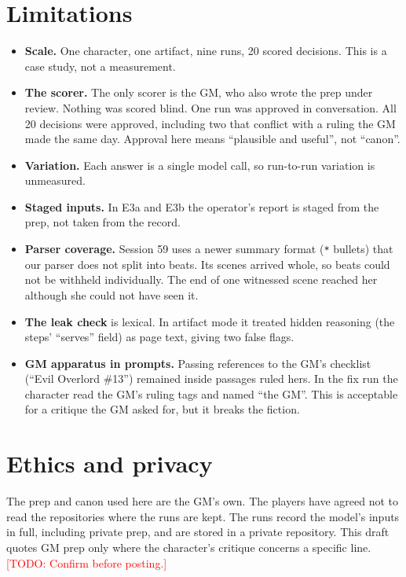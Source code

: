 \documentclass[11pt]{article}
\newcommand{\todo}[1]{\textcolor{red}{[TODO: #1]}}
\newcommand{\code}[1]{\texttt{#1}}
\begin{document}
\section{Limitations}
\label{sec:limitations}

\begin{itemize}[nosep]
\item \textbf{Scale.} One character, one artifact, nine runs, 20 scored decisions. This is a
case study, not a measurement.
\item \textbf{The scorer.} The only scorer is the GM, who also wrote the prep under review.
Nothing was scored blind. One run was approved in conversation. All 20 decisions were
approved, including two that conflict with a ruling the GM made the same day. Approval
here means ``plausible and useful'', not ``canon''.
\item \textbf{Variation.} Each answer is a single model call, so run-to-run variation is
unmeasured.
\item \textbf{Staged inputs.} In E3a and E3b the operator's report is staged from the prep,
not taken from the record.
\item \textbf{Parser coverage.} Session 59 uses a newer summary format (\code{*} bullets)
that our parser does not split into beats. Its scenes arrived whole, so beats could not be
withheld individually. The end of one witnessed scene reached her although she could not
have seen it.
\item \textbf{The leak check} is lexical. In artifact mode it treated hidden reasoning (the
steps' ``serves'' field) as page text, giving two false flags.
\item \textbf{GM apparatus in prompts.} Passing references to the GM's checklist (``Evil
Overlord \#13'') remained inside passages ruled hers. In the fix run the character read the
GM's ruling tags and named ``the GM''. This is acceptable for a critique the GM asked for,
but it breaks the fiction.
\end{itemize}

\section{Ethics and privacy}

The prep and canon used here are the GM's own. The players have agreed not to read the
repositories where the runs are kept. The runs record the model's inputs in full, including
private prep, and are stored in a private repository. This draft quotes GM prep only where
the character's critique concerns a specific line. \todo{Confirm before posting.}
\end{document}
